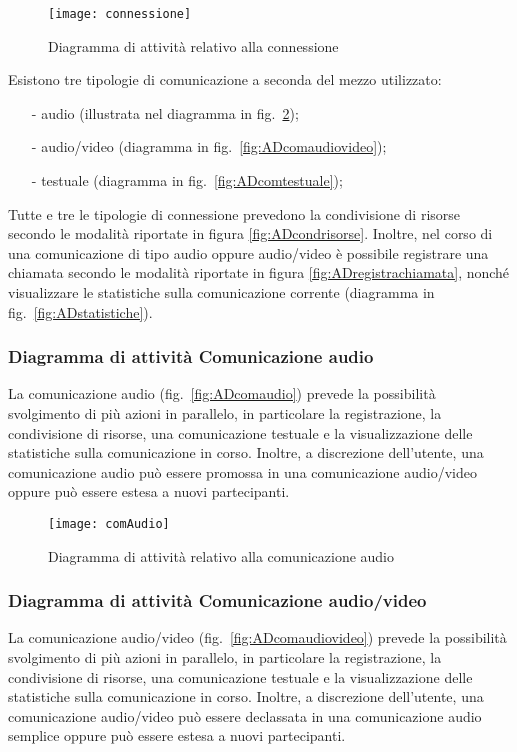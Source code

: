 \begin{figure}[H]
  \centering
  \texttt{[image: connessione]}
  \caption{Diagramma di attività relativo alla connessione}\label{fig:ADconnessione}
\end{figure}

Esistono tre tipologie di comunicazione a seconda del mezzo utilizzato:
\begin{itemize}[noitemsep,nolistsep]
  \item[-] audio (illustrata nel diagramma in fig.~\ref{fig:ADcomaudio});
  \item[-] audio/video (diagramma in fig.~\ref{fig:ADcomaudiovideo});
  \item[-] testuale (diagramma in fig.~\ref{fig:ADcomtestuale});
\end{itemize}


Tutte e tre le tipologie di connessione prevedono la condivisione di risorse secondo le modalità riportate in figura \ref{fig:ADcondrisorse}. Inoltre, nel corso di una comunicazione di tipo audio oppure audio/video è possibile registrare una chiamata secondo le modalità riportate in figura \ref{fig:ADregistrachiamata}, nonché visualizzare le statistiche sulla comunicazione corrente (diagramma in fig.~\vref{fig:ADstatistiche}).

\subsubsection{Diagramma di attività Comunicazione audio}
La comunicazione audio (fig.~\vref{fig:ADcomaudio}) prevede la possibilità svolgimento di più azioni in parallelo, in particolare la registrazione, la condivisione di risorse, una comunicazione testuale e la visualizzazione delle statistiche sulla comunicazione in corso. Inoltre, a discrezione dell'utente, una comunicazione audio può essere promossa in una comunicazione audio/video oppure può essere estesa a nuovi partecipanti.

\begin{figure}[H]
  \centering
  \texttt{[image: comAudio]}
  \caption{Diagramma di attività relativo alla comunicazione audio}\label{fig:ADcomaudio}
\end{figure}

\subsubsection{Diagramma di attività Comunicazione audio/video}
La comunicazione audio/video (fig.~\vref{fig:ADcomaudiovideo}) prevede la possibilità svolgimento di più azioni in parallelo, in particolare la registrazione, la condivisione di risorse, una comunicazione testuale e la visualizzazione delle statistiche sulla comunicazione in corso. Inoltre, a discrezione dell'utente, una comunicazione audio/video può essere declassata in una comunicazione audio semplice oppure può essere estesa a nuovi partecipanti.

